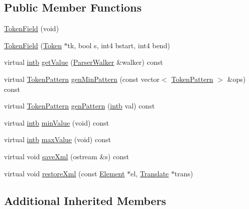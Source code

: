 \subsection*{Public Member Functions}
\begin{DoxyCompactItemize}
\item 
\mbox{\hyperlink{class_token_field_a5885b09edefdc42f4d4ce375afdd0d9a}{Token\+Field}} (void)
\item 
\mbox{\hyperlink{class_token_field_a1bfdc53c1f698232c5af0e89cc14107c}{Token\+Field}} (\mbox{\hyperlink{class_token}{Token}} $\ast$tk, bool s, int4 bstart, int4 bend)
\item 
virtual \mbox{\hyperlink{types_8h_aa925ba3e627c2df89d5b1cfe84fb8572}{intb}} \mbox{\hyperlink{class_token_field_aacb276169a305bf24aa2fd23795c0d12}{get\+Value}} (\mbox{\hyperlink{class_parser_walker}{Parser\+Walker}} \&walker) const
\item 
virtual \mbox{\hyperlink{class_token_pattern}{Token\+Pattern}} \mbox{\hyperlink{class_token_field_a9ad83c4d71dbd0f22c12f670cb07c11c}{gen\+Min\+Pattern}} (const vector$<$ \mbox{\hyperlink{class_token_pattern}{Token\+Pattern}} $>$ \&ops) const
\item 
virtual \mbox{\hyperlink{class_token_pattern}{Token\+Pattern}} \mbox{\hyperlink{class_token_field_a4ce6c18cfc9973c24d7da7314ce8092e}{gen\+Pattern}} (\mbox{\hyperlink{types_8h_aa925ba3e627c2df89d5b1cfe84fb8572}{intb}} val) const
\item 
virtual \mbox{\hyperlink{types_8h_aa925ba3e627c2df89d5b1cfe84fb8572}{intb}} \mbox{\hyperlink{class_token_field_a9b632778768fcc9d396ef12890ada93b}{min\+Value}} (void) const
\item 
virtual \mbox{\hyperlink{types_8h_aa925ba3e627c2df89d5b1cfe84fb8572}{intb}} \mbox{\hyperlink{class_token_field_ad42951c882a6013b44a7632fc60ae5d6}{max\+Value}} (void) const
\item 
virtual void \mbox{\hyperlink{class_token_field_a891f7bfcc1e47b28cb40fc6bd9dbfdbe}{save\+Xml}} (ostream \&s) const
\item 
virtual void \mbox{\hyperlink{class_token_field_a6c2c56a97eeb763ee32c4d66770e1c2f}{restore\+Xml}} (const \mbox{\hyperlink{class_element}{Element}} $\ast$el, \mbox{\hyperlink{class_translate}{Translate}} $\ast$trans)
\end{DoxyCompactItemize}
\subsection*{Additional Inherited Members}



